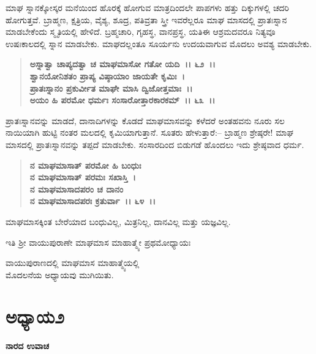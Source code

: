 ಮಾಘ ಸ್ನಾನಕ್ಕೋಸ್ಕರ ಮನೆಯಿಂದ ಹೊರಕ್ಕೆ ಹೋಗುವ ಮಾತ್ರದಿಂದಲೇ ಪಾಪಗಳು ಹತ್ತು ದಿಕ್ಕುಗಳಲ್ಲಿ ಚದರಿ ಹೋಗುತ್ತವೆ. ಬ್ರಾಹ್ಮಣ, ಕ್ಷತ್ರಿಯ, ವೈಶ್ಯ, ಶೂದ್ರ, ಪತಿವ್ರತಾ ಸ್ತ್ರೀ ಇವರೆಲ್ಲರೂ ಮಾಘ ಮಾಸದಲ್ಲಿ ಪ್ರಾತಃಸ್ನಾನ ಮಾಡಬೇಕೆಂದು ಸ್ಮೃತಿಯಲ್ಲಿ ಹೇಳಿದೆ. ಬ್ರಹ್ಮಚಾರಿ, ಗೃಹಸ್ಥ, ವಾನಪ್ರಸ್ಥ, ಯತಿಈ ಆಶ್ರಮದವರೂ ನಿತ್ಯವೂ ಉಷಃಕಾಲದಲ್ಲಿ ಸ್ನಾನ ಮಾಡಬೇಕು. ಮಾಘದಲ್ಲಂತೂ ಸೂರ್ಯನು ಉದಯವಾಗುವ ಮೊದಲು ಅವಶ್ಯ ಮಾಡಬೇಕು.

\begin{verse}
\textbf{ಅಸ್ನಾತ್ವಾ ಚಾಪ್ಯದತ್ವಾ ಚ ಮಾಘಮಾಸೋ ಗತೋ ಯದಿ~।। ೬೨~।।}\\\textbf{ಶ್ವಾನಯೋನಿಶತಂ ಪ್ರಾಪ್ಯ ವಿಷ್ಠಾಯಾಂ ಜಾಯತೇ ಕೃಮಿಃ~।}\\\textbf{ಪ್ರಾತಃಸ್ನಾನಂ ಪ್ರಕುರ್ವೀತ ಮಾಘೇ ಮಾಸಿ ದ್ವಿಜೋತ್ತಮಾಃ~।।} \\\textbf{ಅಯಂ ಹಿ ಪರಮೋ ಧರ್ಮಃ ಸಂಸಾರೋತ್ತಾರಕಾರಕಮ್~।। ೬೩~।।}
\end{verse}

ಪ್ರಾತಃಸ್ನಾನವನ್ನು ಮಾಡದೆ, ದಾನಾದಿಗಳನ್ನು ಕೊಡದೆ ಮಾಘಮಾಸವನ್ನು ಕಳೆದರೆ ಅಂತಹವನು ನೂರು ಸಲ ನಾಯಿಯಾಗಿ ಹುಟ್ಟಿ ನಂತರ ಮಲದಲ್ಲಿ ಕೃಮಿಯಾಗುತ್ತಾನೆ. ಸೂತರು ಹೇಳುತ್ತಾರೆ:– ಬ್ರಾಹ್ಮಣ ಶ್ರೇಷ್ಠರೇ! ಮಾಘ ಮಾಸದಲ್ಲಿ ಪ್ರಾತಃಸ್ನಾನವನ್ನು ತಪ್ಪದೆ ಮಾಡಬೇಕು. ಸಂಸಾರದಿಂದ ಬಿಡುಗಡೆ ಹೊಂದಲು ಇದು ಶ್ರೇಷ್ಠವಾದ ಧರ್ಮ.

\begin{verse}
\textbf{ನ ಮಾಘಮಾಸಾತ್ ಪರಮೋ ಹಿ ಬಂಧುಃ}\\\textbf{ನ ಮಾಘಮಾಸಾತ್ ಪರಮಃ ಸಖಾಸ್ತಿ~।}\\\textbf{ನ ಮಾಘಮಾಸಾದಪರಂ ಚ ದಾನಂ} \\\textbf{ನ ಮಾಘಮಾಸಾದಪರಃ ಕ್ರತುರ್ವಾ~।। ೬೪~।। }
\end{verse}

ಮಾಘಮಾಸಕ್ಕಿಂತ ಬೇರೆಯಾದ ಬಂಧುವಿಲ್ಲ, ಮಿತ್ರನಿಲ್ಲ, ದಾನವಿಲ್ಲ ಮತ್ತು ಯಜ್ಞವಿಲ್ಲ.

\begin{center}
ಇತಿ ಶ‍್ರೀ ವಾಯುಪುರಾಣೇ ಮಾಘಮಾಸ ಮಾಹಾತ್ಮ್ಯೇ ಪ್ರಥಮೋಧ್ಯಾಯಃ
\end{center}

\begin{center}
ವಾಯುಪುರಾಣದಲ್ಲಿ ಮಾಘಮಾಸ ಮಾಹಾತ್ಮ್ಯೆಯಲ್ಲಿ \\ ಮೊದಲನೆಯ ಅಧ್ಯಾಯವು ಮುಗಿಯಿತು.
\end{center}

\newpage

\section*{ಅಧ್ಯಾಯ೨}

\emptypage

\begin{flushleft}
\textbf{ನಾರದ ಉವಾಚ}
\end{flushleft}

